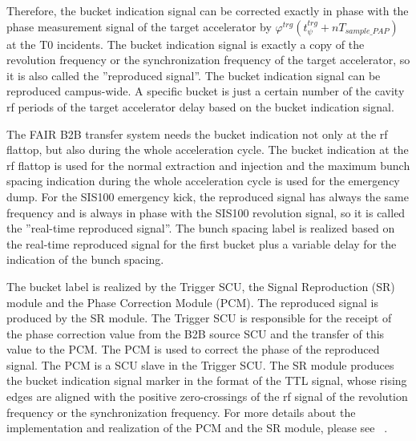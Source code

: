 Therefore, the bucket indication signal can be corrected exactly in phase with the phase measurement signal of the target accelerator by $ \varphi^\mathit{trg}(t_\mathit{\psi}^\mathit{trg}+nT_\mathit{sample\_PAP})$ at the T0 incidents. The bucket indication signal is exactly a copy of the revolution frequency or the synchronization frequency of the target accelerator, so
it is also called the ”reproduced signal”. The bucket indication signal can be reproduced campus-wide. A specific bucket is just a certain number of the cavity rf periods of the target accelerator delay based on the bucket indication signal.






The FAIR B2B transfer system needs the bucket indication not only at the rf flattop, but also during the whole acceleration cycle. The bucket indication at the rf flattop is used for the normal extraction and injection and the maximum bunch spacing indication during the whole acceleration cycle is used for the emergency dump. For the SIS100 emergency kick, the reproduced signal has always the same frequency and is always in phase with the SIS100 revolution signal, so it is called the ''real-time reproduced signal''. The bunch spacing label is realized based on the real-time reproduced signal for the first bucket plus a variable delay for the indication of the bunch spacing.


The bucket label is realized by the Trigger SCU, the Signal Reproduction (SR) module and the Phase Correction Module (PCM). The reproduced signal is produced by the SR module. The Trigger SCU is responsible for the receipt of the phase correction value from the B2B source SCU and the transfer of this value to the PCM. The PCM is used to correct the phase of the reproduced signal. The PCM is a SCU slave in the Trigger SCU. The SR module produces the bucket indication signal marker in the format of the TTL signal, whose rising edges are aligned with the positive zero-crossings of the rf signal of the revolution frequency or the synchronization frequency. For more details about the implementation and realization of the PCM and the SR module, please see ~\cite{ferrand_development_nodate}. 

